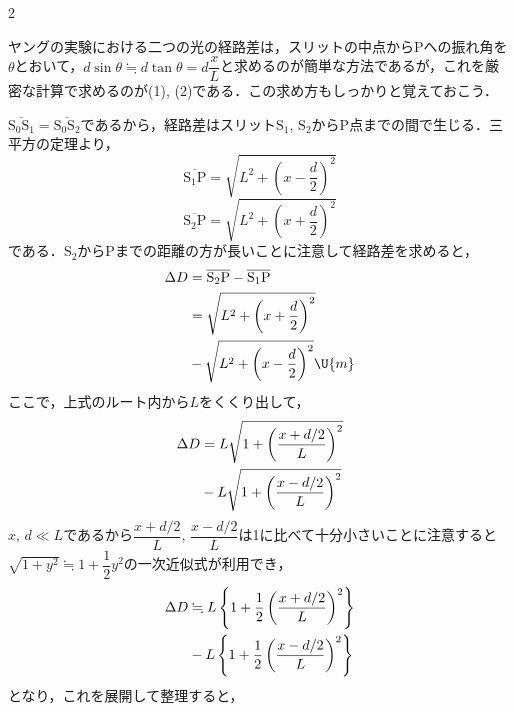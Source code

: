\begin{multicols}{2}
\par\nopagebreak
\begin{sisin}
ヤングの実験における二つの光の経路差は，スリットの中点から$\mathrm{P}$への振れ角を$\theta$とおいて，$d\sin\theta\fallingdotseq d\tan\theta=d\dfrac{x}{L}$と求めるのが簡単な方法であるが，これを厳密な計算で求めるのが(1), (2)である．この求め方もしっかりと覚えておこう．
\end{sisin}
\KaiHead
\begin{komon}
 $\overline{\mathrm{S_0S_1}}=\overline{\mathrm{S_0S_2}}$であるから，経路差はスリット$\mathrm{S_1}$, $\mathrm{S_2}$から$\mathrm{P}$点までの間で生じる．三平方の定理より，
       \[\overline{\mathrm{S_1P}}=\sqrt{L^2+\left(x-\frac{d}{2}\right)^2}\]
       \[\overline{\mathrm{S_2P}}=\sqrt{L^2+\left(x+\frac{d}{2}\right)^2}\]
       である．$\mathrm{S_2}$から$\mathrm{P}$までの距離の方が長いことに注意して経路差を求めると，
       \[\begin{aligned}
         \Delta D&=\overline{\mathrm{S_2P}}-\overline{\mathrm{S_1P}}\\
          &=\sqrt{L^2+\left(x+\frac{d}{2}\right)^2}\\
          &\hspace*{\fill}-\sqrt{L^2+\left(x-\frac{d}{2}\right)^2}\U{m}
       \end{aligned}\]
       \hspace*{\fill}\Ans
{} ここで，上式のルート内から$L$をくくり出して，
       \[\begin{aligned}
         \Delta D&=L\sqrt{1+\left(\frac{x+d/2}{L}\right)^2}\\
          &\hspace*{\fill}-L\sqrt{1+\left(\frac{x-d/2}{L}\right)^2}
       \end{aligned}\]
       \hspace{1zw}$x$, $d\ll L$であるから$\dfrac{x+d/2}{L}$, $\dfrac{x-d/2}{L}$は1に比べて十分小さいことに注意すると$\sqrt{1+y^2}\fallingdotseq 1+\dfrac{1}{2}y^2$の一次近似式が利用でき，
       \[\begin{aligned}
         \Delta D&\fallingdotseq L\left\{1+\frac{1}{2}\left(\frac{x+d/2}{L}\right)^2\right\}\\
          &\hspace*{\fill}-L\left\{1+\frac{1}{2}\left(\frac{x-d/2}{L}\right)^2\right\}
       \end{aligned}\]
       となり，これを展開して整理すると，

\end{komon}
\end{multicols}
